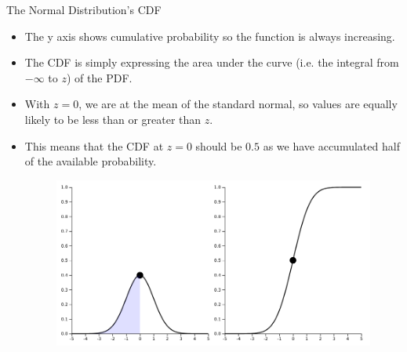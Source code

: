 \documentclass[handout]{beamer}
\begin{document}
\begin{frame}{The Normal Distribution’s CDF}

\scriptsize{
\begin{itemize}
\item The y axis shows cumulative probability so  the function is always increasing.
 
\item The CDF is simply expressing the area under the curve (i.e. the integral from $-\infty$ to $z$) of the PDF. 
 
\item With $z = 0$, we are at the mean of the standard normal, so values are equally likely to be less than or greater than $z$. 

\item This means that the CDF at $z = 0$ should be $0.5$ as we have accumulated half of the available probability. 

   \begin{figure}[h!]
	\centering
	\includegraphics[scale=0.25]{pics/cdfpdf.png}
\end{figure}

 
 \end{itemize}

}
\end{frame}
\end{document}

